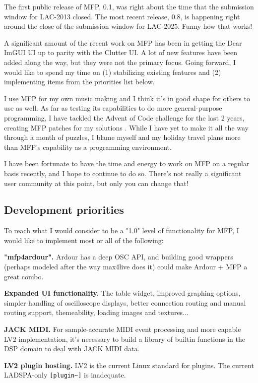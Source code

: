 \documentclass[a4paper]{article}
\def\:{\hskip0pt}
\begin{document}
The first public release of MFP, 0.1, was right about the time that the
submission window for LAC-2013 closed. The most recent release,
0.8, is happening right around the close of the submission window
for LAC-2025. Funny how that works!

A significant amount of the recent work on MFP has been in
getting the Dear ImGUI UI up to parity with the Clutter UI. A lot
of new features have been added along the way, but they were not
the primary focus. Going forward, I would like to spend my time
on (1) stabilizing existing features and (2) implementing items
from the priorities list below.

I use MFP for my own music making and I think it's in good shape
for others to use as well. As far as testing its capabilities to
do more general\:-\:purpose programming, I have tackled the
Advent of Code \cite{AdventOfCode} challenge for the last 2
years, creating MFP patches for my solutions
\cite{Gribble:Advent}. While I have yet to make it all the way
through a month of puzzles, I blame myself and my holiday travel
plans more than MFP's capability as a programming environment.

I have been fortunate to have the time and energy to work on MFP
on a regular basis recently, and I hope to continue to do so.
There's not really a significant user community at this point,
but only you can change that!

\subsection{Development priorities}

To reach what I would consider to be a "1.0" level of
functionality for MFP, I would like to implement most or all of
the following:

{\bf "mfp4ardour".} Ardour has a deep OSC API, and building good
wrappers (perhaps modeled after the way max4live does it) could
make Ardour + MFP a great combo.

{\bf Expanded UI functionality.} The table widget, improved
graphing options, simpler handling of oscilloscope displays,
better connection routing and manual routing support, themeability,
loading images and textures...

{\bf JACK MIDI.} For sample-accurate MIDI event processing and
more capable LV2 implementation, it's necessary to build a
library of builtin functions in the DSP domain to deal with JACK
MIDI data.

{\bf LV2 plugin hosting.} LV2 is the current Linux standard for
plugins. The current LADSPA-only {\tt [plugin\textasciitilde]} is inadequate.
\end{document}
